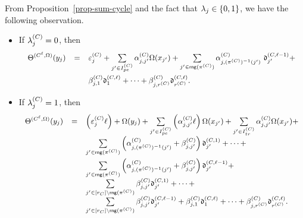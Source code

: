 From Proposition~\ref{prop-sum-cycle} and the fact that $\lambda_{j} \in \{0, 1\}$, we have the following observation.
\begin{itemize}
\item If $\lambda^{(C)}_{j}=0$, then
\[
\small
\begin{array}{l c l}
\smallskip
\sumf^{(C^\ell,\initval)}(y_j)  & = & \cste^{(C)}_{j} +  \sum \limits_{j' \in I^{(C)}_{pe}} \csta^{(C)}_{j,j'} \initval(x_{j'}) +
\sum \limits_{j'  \in \rng(\pi^{(C)})} \csta^{(C)}_{j, (\pi^{(C)})^{-1}(j')}\ \vard^{(C,\ell-1)}_{j'} + \\
%
& & \cstb^{(C)}_{j, 1} \vard^{(C,\ell)}_{1} + \dots + \cstb^{(C)}_{j,r^{(C)}} \vard^{(C,\ell)}_{r^{(C)}}.
\end{array} 
\]
\item If $\lambda^{(C)}_{j}=1$, then 
\[
\small
\begin{array}{l c l}
\sumf^{(C^\ell,\initval)}(y_j)  & = &  \left(\cste^{(C)}_{j} \ell \right) + \initval(y_j) +   \sum  \limits_{j' \in I^{(C)}_{pe}} \left(\csta^{(C)}_{j,j'} \ell \right) \initval(x_{j'}) + \sum \limits_{j' \in I^{(C)}_{tr}} \csta^{(C)}_{j,j'} \initval(x_{j'}) +  \\
\smallskip
& & \sum \limits_{j' \in \rng(\pi^{(C)})} \left(\csta^{(C)}_{j, (\pi^{(C)})^{-1}(j')} + \cstb^{(C)}_{j,j'} \right) \vard^{(C,1)}_{j'} + \dots +\\
%
& &  \sum \limits_{j' \in \rng(\pi^{(C)})}  \left(\csta^{(C)}_{j, (\pi^{(C)})^{-1}(j')}+\cstb^{(C)}_{j,j'} \right) \vard^{(C,\ell-1)}_{j'} + \\
%
& & \sum \limits_{j' \in [r_C]  \setminus \rng(\pi^{(C)}) } \cstb^{(C)}_{j,j'} \vard^{(C,1)}_{j'} + \dots + \\
%
%
& & \sum \limits_{j' \in [r_C]  \setminus \rng(\pi^{(C)}) } \cstb^{(C)}_{j,j'} \vard^{(C,\ell-1)}_{j'} + \cstb^{(C)}_{j, 1} \vard^{(C,\ell)}_{1} + \dots + \cstb^{(C)}_{j,r^{(C)}} \vard^{(C,\ell)}_{r^{(C)}}.
\end{array} 
\]
%
\end{itemize}
